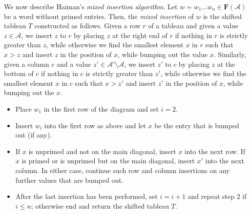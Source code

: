 \documentclass[12 pt]{amsart}
\newcommand{\Free}{\mathbf{F}}
\newcommand{\cA}{\mathcal{A}}
\newtheorem{theorem}[thm]{Theorem}
\theoremstyle{remark}
\numberwithin{equation}{section}
\begin{document}



We now describe Haiman's \cite{Haiman} \emph{mixed insertion algorithm}.
Let $w=w_1\ldots w_n \in \Free(\cA)$ be a word without primed entries. Then, the \emph{mixed insertion} of $w$ is the shifted tableau $T$ constructed as follows.
Given a row $r$ of a tableau and given a value $z \in \cA$, we insert $z$ to $r$ by placing $z$ at the right end of $r$ if nothing in $r$ is strictly greater than $z$, while otherwise we find the smallest element $x$ in $r$ such that $x > z$ and insert $z$ in the position of $x$, while bumping out the value $x$. Similarly, given a column $c$ and a value $z' \in \cA' \setminus \cA$, we insert $z'$ to $c$ by placing $z$ at the bottom of $c$ if nothing in $c$ is strictly greater than $z'$, while otherwise we find the smallest element $x$ in $c$ such that $x > z'$ and insert $z'$ in the position of $x$, while bumping out the $x$.

\begin{itemize}
    \item Place $w_1$ in the first row of the diagram and set $i=2.$
    \item Insert $w_i$ into the first row as above and let $x$ be the entry that is bumped out (if any). 
    \item If $x$ is unprimed and not on the main diagonal, insert $x$ into the next row. If $x$ is primed or is unprimed but on the main diagonal, insert $x'$ into the next column. In either case, continue such row and column insertions on any further values that are bumped out.
    \item After the last insertion has been performed, set $i=i+1$ and repeat step $2$ if $i\leq n$; otherwise end and return the shifted tableau $T$.
\end{itemize}
\end{document}
